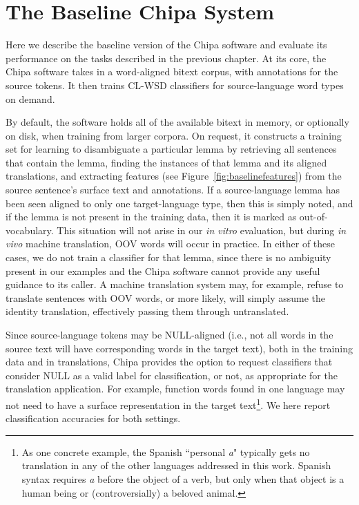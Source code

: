 \chapter{The Baseline Chipa System}
\label{chap:baseline}
Here we describe the baseline version of the Chipa software and evaluate its
performance on the tasks described in the previous chapter.
At its core, the Chipa software takes in a word-aligned bitext corpus, with
annotations for the source tokens. It then trains CL-WSD classifiers for
source-language word types on demand. 

By default, the software holds all of the available bitext in memory, or
optionally on disk, when training from larger corpora. On request, it
constructs a training set for learning to disambiguate a particular lemma
by retrieving all sentences that contain the lemma,
finding the instances of that lemma and its aligned translations, and extracting
features (see Figure~\ref{fig:baselinefeatures}) from the source sentence's
surface text and annotations.
If a source-language lemma has been seen aligned to only one target-language
type, then this is simply noted, and if the lemma is not present in the
training data, then it is marked as out-of-vocabulary. This situation will not
arise in our \emph{in vitro} evaluation, but during \emph{in vivo} machine
translation, OOV words will occur in practice.
In either of these cases, we do not train a classifier for that lemma, since
there is no ambiguity present in our examples and the Chipa software cannot
provide any useful guidance to its caller. A machine translation system may,
for example, refuse to translate sentences with OOV words, or more likely, will
simply assume the identity translation, effectively passing them through
untranslated.

Since source-language tokens may be NULL-aligned (i.e., not all words in the
source text will have corresponding words in the target text), both in the
training data and in translations, Chipa provides the option to request
classifiers that consider NULL as a valid label for classification, or not, as
appropriate for the translation application. For example, function words found
in one language may not need to have a surface representation in
the target text\footnote{As one concrete example, the Spanish ``personal
\emph{a}" typically gets no translation in any of the other languages addressed
in this work. Spanish syntax requires \emph{a} before the object of a verb,
but only when that object is a human being or (controversially) a beloved
animal.}.
We here report classification accuracies for both settings.

